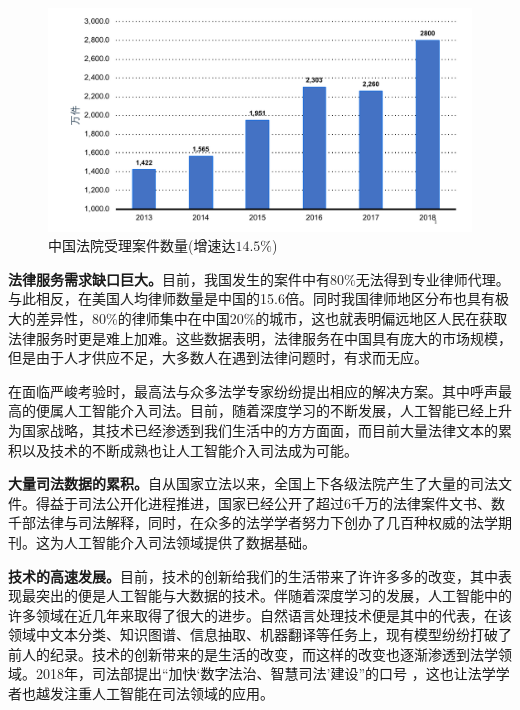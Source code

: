 \begin{figure}[ht]
    \centering
    \includegraphics[width=\linewidth]{figures/case_num}
    \caption{中国法院受理案件数量(增速达\textbf{$14.5\%$})}
    \label{fig:case_num}
\end{figure}

\textbf{法律服务需求缺口巨大。}目前，我国发生的案件中有80\%无法得到专业律师代理。与此相反，在美国人均律师数量是中国的15.6倍。同时我国律师地区分布也具有极大的差异性，80\%的律师集中在中国20\%的城市，这也就表明偏远地区人民在获取法律服务时更是难上加难。这些数据表明，法律服务在中国具有庞大的市场规模，但是由于人才供应不足，大多数人在遇到法律问题时，有求而无应。

在面临严峻考验时，最高法与众多法学专家纷纷提出相应的解决方案。其中呼声最高的便属人工智能介入司法。目前，随着深度学习的不断发展，人工智能已经上升为国家战略，其技术已经渗透到我们生活中的方方面面，而目前大量法律文本的累积以及技术的不断成熟也让人工智能介入司法成为可能。

\textbf{大量司法数据的累积。}自从国家立法以来，全国上下各级法院产生了大量的司法文件。得益于司法公开化进程推进，国家已经公开了超过6千万的法律案件文书、数千部法律与司法解释，同时，在众多的法学学者努力下创办了几百种权威的法学期刊。这为人工智能介入司法领域提供了数据基础。

\textbf{技术的高速发展。}目前，技术的创新给我们的生活带来了许许多多的改变，其中表现最突出的便是人工智能与大数据的技术。伴随着深度学习的发展，人工智能中的许多领域在近几年来取得了很大的进步。自然语言处理技术便是其中的代表，在该领域中文本分类、知识图谱、信息抽取、机器翻译等任务上，现有模型纷纷打破了前人的纪录。技术的创新带来的是生活的改变，而这样的改变也逐渐渗透到法学领域。2018年，司法部提出“加快‘数字法治、智慧司法’建设”的口号 ，这也让法学学者也越发注重人工智能在司法领域的应用。


